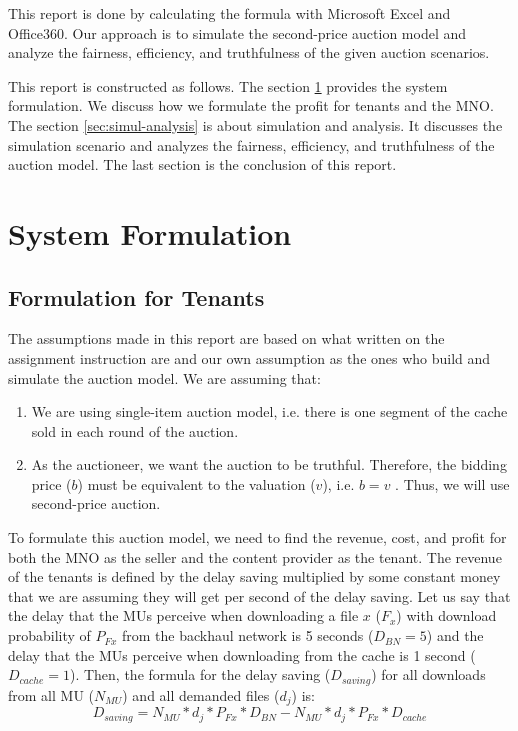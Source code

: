 \documentclass[conference]{IEEEtran}
\begin{document}
This report is done by calculating the formula with Microsoft Excel and Office360. Our approach is to simulate the second-price auction model and analyze the fairness, efficiency, and truthfulness of the given auction scenarios. 

This report is constructed as follows.
The section \ref{sec:sys-formulation} provides the system formulation.
We discuss how we formulate the profit for tenants and the MNO.
The section \ref{sec:simul-analysis} is about simulation and analysis.
It discusses the simulation scenario and analyzes the fairness, efficiency, and truthfulness of the auction model.
The last section is the conclusion of this report.

\section{System Formulation}\label{sec:sys-formulation}

\subsection{Formulation for Tenants}

The assumptions made in this report are based on what written on the assignment instruction are and our own assumption as the ones who build and simulate the auction model.
We are assuming that:
\begin{enumerate}
	\item We are using single-item auction model, i.e. there is one segment of the cache sold in each round of the auction.
	\item As the auctioneer, we want the auction to be truthful. Therefore, the bidding price ($b$) must be equivalent to the valuation ($v$), i.e. $b = v$ \cite{lecture2onapplicationandservices}. Thus, we will use second-price auction.
\end{enumerate}

To formulate this auction model, we need to find the revenue, cost, and profit for both the MNO as the seller and the content provider as the tenant.
The revenue of the tenants is defined by the delay saving multiplied by some constant money that we are assuming they will get per second of the delay saving.
Let us say that the delay that the MUs perceive when downloading a file $x$ ($F_x$) with download probability of $P_{Fx}$ from the backhaul network is 5 seconds ($D_{BN} = 5$) and the delay that the MUs perceive when downloading from the cache is 1 second ($D_{cache} = 1$).
Then, the formula for the delay saving ($D_{saving}$) for all downloads from all MU ($N_{MU}$) and all demanded files ($d_j$) is: 
\begin{equation}
D_{saving} = N_{MU} * d_j * P_{Fx} * D_{BN} - N_{MU} * d_j * P_{Fx} * D_{cache} \label{eq}
\end{equation}
\end{document}
